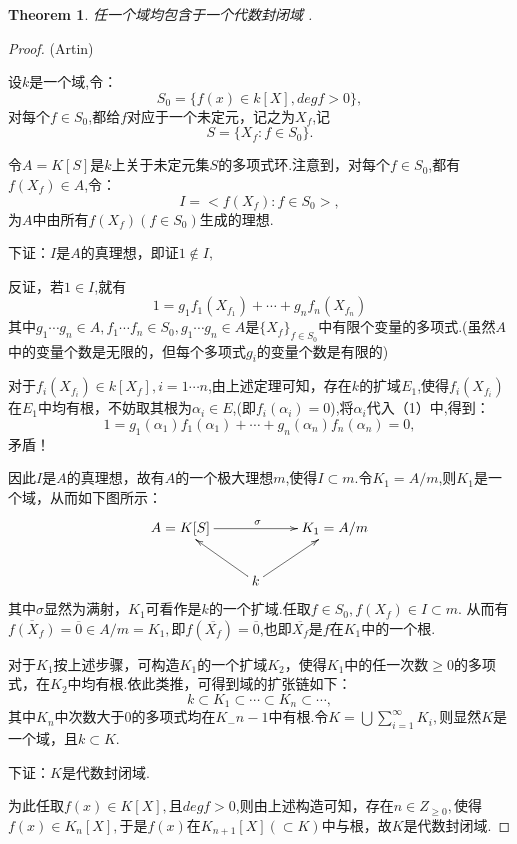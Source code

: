 \documentclass[UTF8]{article}
\newtheorem{thm}{Theorem}[section]
\begin{document}
\begin{thm}任一个域均包含于一个代数封闭域 .
	\end{thm}
\begin{proof}
(Artin)

设$k$是一个域,令：
$$S_0=\{f(x)\in k[X],degf>0\},$$对每个$f\in S_0$,都给$f$对应于一个未定元，记之为$X_f$,记$$S=\{X_f:f\in S_0\}.$$

令$A=K[S]$是$k$上关于未定元集$S$的多项式环.注意到，对每个$f\in S_0$,都有$f(X_f)\in A$,令：$$I=<f(X_f):f\in S_0>,$$为$A$中由所有$f(X_f)(f\in S_0)$生成的理想.

下证：$I$是$A$的真理想，即证$1\notin I,$

反证，若$1\in I$,就有
\begin{equation}
1=g_1f_1(X_{f_1})+\cdots+g_nf_n(X_{f_n})
\end{equation}
其中$g_1\cdots g_n\in A,f_1\cdots f_n\in S_0,g_1\cdots g_n\in A$是$\{X_f\}_{f\in S_0}$中有限个变量的多项式.(虽然$A$中的变量个数是无限的，但每个多项式$g_i$的变量个数是有限的)

对于$f_i(X_{f_i})\in k[X_f],i=1\cdots n$,由上述定理可知，存在$k$的扩域$E_1$,使得$f_i(X_{f_i})$在$E_1$中均有根，不妨取其根为$\alpha_i\in E$,(即$f_i(\alpha_i)=0$),将$\alpha_i$代入（1）中,得到：$$1=g_1(\alpha_1)f_1(\alpha_1)+\cdots+g_n(\alpha_n)f_n(\alpha_n)=0,$$矛盾！

因此$I$是$A$的真理想，故有$A$的一个极大理想$m$,使得$I\subset m$.令$K_1=A/m$,则$K_1$是一个域，从而如下图所示：$$\xymatrix{A=K[S]\ar[rr]^{\sigma }&&{K_1=A/m}\\& k\ar[lu] \ar[ru] & }$$其中$\sigma $显然为满射，$K_1$可看作是$k$的一个扩域.任取$f\in S_0,f(X_f)\in I\subset m.$ 从而有$\overline{f(X_f)}=\overline{0}\in A/m=K_1,$即$f(\overline{X_f})=\overline{0}$,也即$\overline{X_f}$是$f$在$K_1$中的一个根.

对于$K_1$按上述步骤，可构造$K_1$的一个扩域$K_2$，使得$K_1$中的任一次数$\ge0$的多项式，在$K_2$中均有根.依此类推，可得到域的扩张链如下：$$k\subset K_1\subset\cdots\subset K_n\subset\cdots, $$其中$ K_n$中次数大于0的多项式均在$ K_-{n-1}$中有根.令$K=\bigcup\sum_{i=1}^\infty K_i,$则显然$K$是一个域，且$k\subset K$.

下证：$K$是代数封闭域.

为此任取$f(x)\in K[X],$且$degf>0$,则由上述构造可知，存在$n\in Z_{\ge0},$使得$f(x)\in K_n[X],$于是$f(x)$在$K_{n+1}[X](\subset K)$中与根，故$K$是代数封闭域.
\end{proof}
\end{document}
